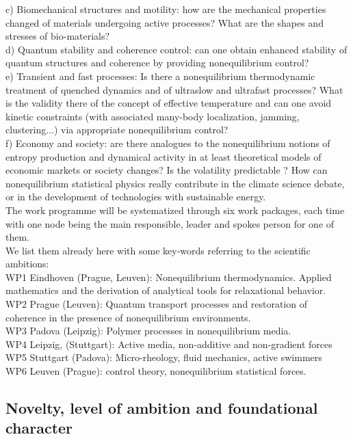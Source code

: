 c) Biomechanical structures and motility: how are the mechanical properties changed of materials undergoing active processes?  What are the shapes and stresses of bio-materials?\\
d) Quantum stability and coherence control: can one obtain enhanced stability of quantum structures and coherence by providing nonequilibrium control?\\
e) Transient and fast processes: Is there a nonequilibrium thermodynamic treatment of quenched dynamics and of ultraslow and ultrafast processes?  What is the validity there of the concept of effective temperature and can one avoid kinetic constraints (with associated many-body localization, jamming, clustering...) via appropriate nonequilibrium control?\\
f) Economy and society: are there analogues to the nonequilibrium notions of entropy production and dynamical activity in at least theoretical models of economic markets or society changes?  Is the volatility predictable ?  How can nonequilibrium statistical physics really contribute in the climate science debate, or in the development of technologies with  sustainable energy.\\

The work programme will be systematized through six work packages, each time with one node being the main responsible, leader and spokes person for one of them.\\
We list them already here with some key-words referring to the scientific ambitions:\\
WP1 Eindhoven (Prague, Leuven): Nonequilibrium thermodynamics.  Applied mathematics and the derivation of analytical tools for relaxational behavior.\\
WP2 Prague (Leuven): Quantum transport processes and restoration of coherence in the presence of nonequilibrium environments.\\
WP3 Padova (Leipzig): Polymer processes in nonequilibrium media.\\
WP4 Leipzig, (Stuttgart):  Active media, non-additive and non-gradient forces\\
WP5 Stuttgart (Padova): Micro-rheology, fluid mechanics, active swimmers\\
WP6 Leuven (Prague): control theory, nonequilibrium statistical forces.\\

\subsection{Novelty, level of ambition and foundational character}\label{sec:progress}

